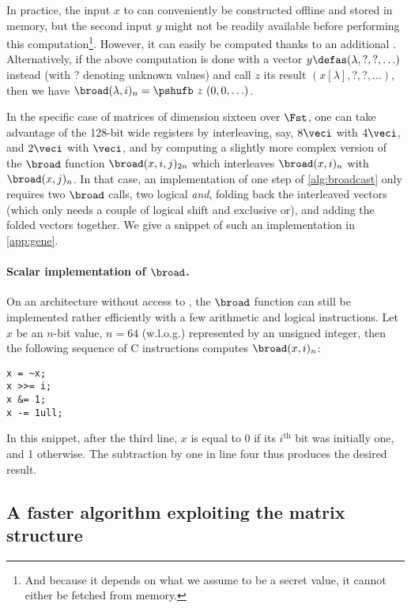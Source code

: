 In practice, the input $x$ to \pshufb{} can conveniently be constructed offline and stored in memory, but the second input $y$ might not be readily available before
performing this computation\footnote{And because it depends on what we assume to be a secret value, it cannot either be fetched from memory.}.
However, it can easily be computed thanks to an additional \pshufb{}. Alternatively, if the
above computation is done with a vector $y \defas (\lambda, ?, ?, \ldots)$ instead (with $?$ denoting unknown values) and call $z$ its result $(x[\lambda], ?, ?, \ldots)$,
then we have $\broad(\lambda, i)_n = \pshufb~z~ (0, 0, \ldots)$.

\medskip

In the specific case of matrices of dimension sixteen over $\Fst$, one can take advantage of the 128-bit
wide \xmm{} registers by interleaving, say, $8\veci$ with $4\veci$, and $2\veci$ with $\veci$, and by computing a slightly more
complex version of the $\broad$ function $\broad(x,i,j)_{2n}$ which interleaves $\broad(x,i)_n$ with $\broad(x,j)_n$.
In that case, an implementation of one step of \autoref{alg:broadcast} only requires two $\broad$ calls, two logical \emph{and}, folding back the interleaved vectors
(which only needs a couple of logical shift and exclusive or), and adding the folded vectors together.
We give a snippet of such an implementation in \autoref{app:gene}.

\paragraph{Scalar implementation of $\broad$.}
On an architecture without access to \pshufb, the $\broad$ function can still be implemented rather efficiently with a few arithmetic and logical instructions.
Let $x$ be an $n$-bit value, $n = 64$ (w.l.o.g.) represented by an unsigned integer, then the following sequence of C instructions computes $\broad(x,i)_n$:
\begin{center}
\begin{verbatim}
x = ~x;
x >>= i;
x &= 1;
x -= 1ull;
\end{verbatim}
\end{center}
In this snippet, after the third line, $x$ is equal to 0 if its $i^\text{th}$ bit was initially one, and 1 otherwise. The subtraction by one in line four thus produces the desired result.

\subsection{A faster algorithm exploiting the matrix structure}
\label{shuff}

